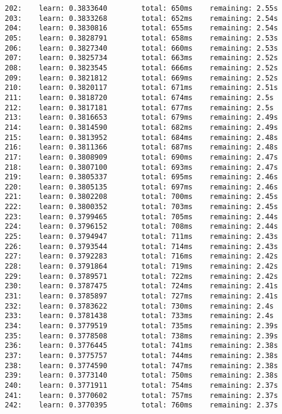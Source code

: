 \documentclass[11pt]{article}
\begin{document}
\begin{Verbatim}[commandchars=\\\{\}]
202:    learn: 0.3833640        total: 650ms    remaining: 2.55s
203:    learn: 0.3833268        total: 652ms    remaining: 2.54s
204:    learn: 0.3830816        total: 655ms    remaining: 2.54s
205:    learn: 0.3828791        total: 658ms    remaining: 2.53s
206:    learn: 0.3827340        total: 660ms    remaining: 2.53s
207:    learn: 0.3825734        total: 663ms    remaining: 2.52s
208:    learn: 0.3823545        total: 666ms    remaining: 2.52s
209:    learn: 0.3821812        total: 669ms    remaining: 2.52s
210:    learn: 0.3820117        total: 671ms    remaining: 2.51s
211:    learn: 0.3818720        total: 674ms    remaining: 2.5s
212:    learn: 0.3817181        total: 677ms    remaining: 2.5s
213:    learn: 0.3816653        total: 679ms    remaining: 2.49s
214:    learn: 0.3814590        total: 682ms    remaining: 2.49s
215:    learn: 0.3813952        total: 684ms    remaining: 2.48s
216:    learn: 0.3811366        total: 687ms    remaining: 2.48s
217:    learn: 0.3808909        total: 690ms    remaining: 2.47s
218:    learn: 0.3807100        total: 693ms    remaining: 2.47s
219:    learn: 0.3805337        total: 695ms    remaining: 2.46s
220:    learn: 0.3805135        total: 697ms    remaining: 2.46s
221:    learn: 0.3802208        total: 700ms    remaining: 2.45s
222:    learn: 0.3800352        total: 703ms    remaining: 2.45s
223:    learn: 0.3799465        total: 705ms    remaining: 2.44s
224:    learn: 0.3796152        total: 708ms    remaining: 2.44s
225:    learn: 0.3794947        total: 711ms    remaining: 2.43s
226:    learn: 0.3793544        total: 714ms    remaining: 2.43s
227:    learn: 0.3792283        total: 716ms    remaining: 2.42s
228:    learn: 0.3791864        total: 719ms    remaining: 2.42s
229:    learn: 0.3789571        total: 722ms    remaining: 2.42s
230:    learn: 0.3787475        total: 724ms    remaining: 2.41s
231:    learn: 0.3785897        total: 727ms    remaining: 2.41s
232:    learn: 0.3783622        total: 730ms    remaining: 2.4s
233:    learn: 0.3781438        total: 733ms    remaining: 2.4s
234:    learn: 0.3779519        total: 735ms    remaining: 2.39s
235:    learn: 0.3778508        total: 738ms    remaining: 2.39s
236:    learn: 0.3776445        total: 741ms    remaining: 2.38s
237:    learn: 0.3775757        total: 744ms    remaining: 2.38s
238:    learn: 0.3774590        total: 747ms    remaining: 2.38s
239:    learn: 0.3773140        total: 750ms    remaining: 2.38s
240:    learn: 0.3771911        total: 754ms    remaining: 2.37s
241:    learn: 0.3770602        total: 757ms    remaining: 2.37s
242:    learn: 0.3770395        total: 760ms    remaining: 2.37s

\end{Verbatim}
\end{document}
